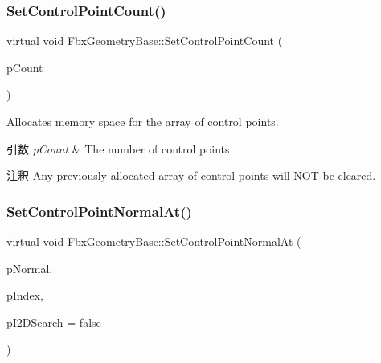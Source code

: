 \subsubsection{\texorpdfstring{Set\+Control\+Point\+Count()}{SetControlPointCount()}}
{\footnotesize\ttfamily virtual void Fbx\+Geometry\+Base\+::\+Set\+Control\+Point\+Count (\begin{DoxyParamCaption}\item[{int}]{p\+Count }\end{DoxyParamCaption})\hspace{0.3cm}{\ttfamily [virtual]}}

Allocates memory space for the array of control points. 
\begin{DoxyParams}{引数}
{\em p\+Count} & The number of control points. \\
\hline
\end{DoxyParams}
\begin{DoxyRemark}{注釈}
Any previously allocated array of control points will N\+OT be cleared. 
\end{DoxyRemark}
\mbox{\label{class_fbx_geometry_base_a219c072f0c9a67ddcc928ab3998f9494}} 
\subsubsection{\texorpdfstring{Set\+Control\+Point\+Normal\+At()}{SetControlPointNormalAt()}}
{\footnotesize\ttfamily virtual void Fbx\+Geometry\+Base\+::\+Set\+Control\+Point\+Normal\+At (\begin{DoxyParamCaption}\item[{const \hyperlink{class_fbx_vector4}{Fbx\+Vector4} \&}]{p\+Normal,  }\item[{int}]{p\+Index,  }\item[{bool}]{p\+I2\+D\+Search = {\ttfamily false} }\end{DoxyParamCaption})\hspace{0.3cm}{\ttfamily [virtual]}}

